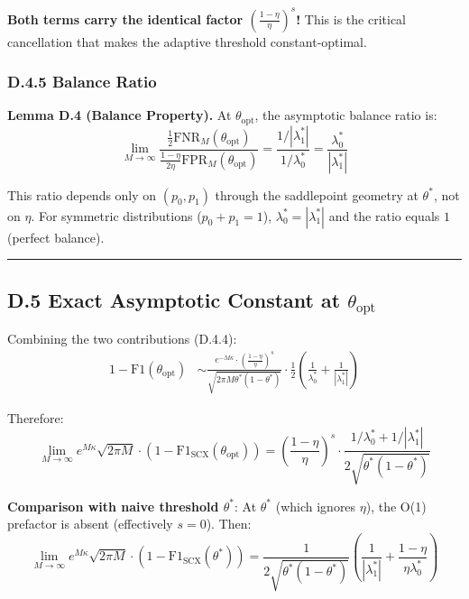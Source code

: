\documentclass[
  12pt,
]{article}
\begin{document}
\textbf{Both terms carry the identical factor
\(\left(\frac{1-\eta}{\eta}\right)^{s}\)!} This is the critical
cancellation that makes the adaptive threshold constant-optimal.

\subsubsection{D.4.5 Balance Ratio}\label{d.4.5-balance-ratio}

\textbf{Lemma D.4 (Balance Property).} At \(\theta_{\text{opt}}\), the
asymptotic balance ratio is:
\[\lim_{M\to\infty} \frac{\frac{1}{2}\text{FNR}_M(\theta_{\text{opt}})}{\frac{1-\eta}{2\eta}\text{FPR}_M(\theta_{\text{opt}})} = \frac{1/|\lambda_1^*|}{1/\lambda_0^*} = \frac{\lambda_0^*}{|\lambda_1^*|}\]

This ratio depends only on \((p_0, p_1)\) through the saddlepoint
geometry at \(\theta^*\), not on \(\eta\). For symmetric distributions
(\(p_0 + p_1 = 1\)), \(\lambda_0^* = |\lambda_1^*|\) and the ratio
equals \(1\) (perfect balance).

\begin{center}\rule{0.5\linewidth}{0.5pt}\end{center}

\subsection{\texorpdfstring{D.5 Exact Asymptotic Constant at
\(\theta_{\text{opt}}\)}{D.5 Exact Asymptotic Constant at \textbackslash theta\_\{\textbackslash text\{opt\}\}}}\label{d.5-exact-asymptotic-constant-at-theta_textopt}

Combining the two contributions (D.4.4): \[\begin{aligned}
1 - \text{F1}(\theta_{\text{opt}}) &\sim \frac{e^{-M\kappa} \cdot \left(\frac{1-\eta}{\eta}\right)^{s}}{\sqrt{2\pi M \theta^*(1-\theta^*)}} \cdot \frac{1}{2}\left(\frac{1}{\lambda_0^*} + \frac{1}{|\lambda_1^*|}\right)
\end{aligned}\]

Therefore:
\[\boxed{\lim_{M\to\infty} e^{M\kappa} \sqrt{2\pi M} \cdot (1 - \text{F1}_{\text{SCX}}(\theta_{\text{opt}})) = \left(\frac{1-\eta}{\eta}\right)^{s} \cdot \frac{1/\lambda_0^* + 1/|\lambda_1^*|}{2\sqrt{\theta^*(1-\theta^*)}}}\]

\textbf{Comparison with naive threshold \(\theta^*\)}: At \(\theta^*\)
(which ignores \(\eta\)), the O(1) prefactor is absent (effectively
\(s=0\)). Then:
\[\lim_{M\to\infty} e^{M\kappa} \sqrt{2\pi M} \cdot (1 - \text{F1}_{\text{SCX}}(\theta^*)) = \frac{1}{2\sqrt{\theta^*(1-\theta^*)}}\left(\frac{1}{|\lambda_1^*|} + \frac{1-\eta}{\eta\lambda_0^*}\right)\]
\end{document}
